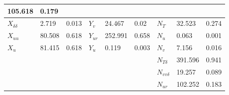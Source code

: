 \documentclass[review]{elsarticle}
\begin{document}
\begin{savenotes}
\begin{tabulary}{\linewidth}[t]{|T|T|T|T|T|T|T|T|T|}
 \sphinxhyphen{}105.618
 &
 
 0.179
 \\
 \hline
 
 \( X_{\delta\delta} \)
 &
 
 \sphinxhyphen{}2.719
 &
 
 0.013
 &
 
 \( Y_{v} \)
 &
 
 \sphinxhyphen{}24.467
 &
 
 0.02
 &
 
 \( N_{T} \)
 &
 
 \sphinxhyphen{}32.523
 &
 
 0.274
 \\
 \hline
 
 \( X_{uu} \)
 &
 
 80.508
 &
 
 0.618
 &
 
 \( Y_{ur} \)
 &
 
 \sphinxhyphen{}252.991
 &
 
 0.658
 &
 
 \( N_{u} \)
 &
 
 0.063
 &
 
 0.001
 \\
 \hline
 
 \( X_{u} \)
 &
 
 \sphinxhyphen{}81.415
 &
 
 0.618
 &
 
 \( Y_{u} \)
 &
 
 \sphinxhyphen{}0.119
 &
 
 0.003
 &
 
 \( N_{v} \)
 &
 
 \sphinxhyphen{}7.156
 &
 
 0.016
 \\
 \hline&&&&&&
 
 \( N_{T\delta} \)
 &
 
 \sphinxhyphen{}391.596
 &
 
 0.941
 \\
 \hline&&&&&&
 
 \( N_{vv\delta} \)
 &
 
 \sphinxhyphen{}19.257
 &
 
 0.089
 \\
 \hline&&&&&&
 
 \( N_{ur} \)
 &
 
 102.252
 &
 
 0.183
 \\
 \hline
 \end{tabulary}
 \par
 \sphinxattableend\end{savenotes}
\end{document}
